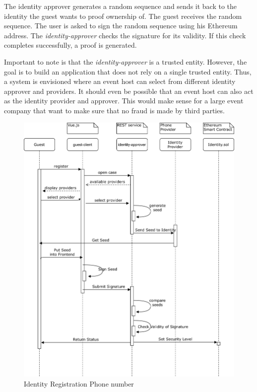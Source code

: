 The identity approver generates a random sequence and sends it back to the identity the guest wants to proof ownership of. The guest receives the random sequence. The user is asked to sign the random sequence using his Ethereum address. The \textit{identity-approver} checks the signature for its validity. If this check completes successfully, a proof is generated.

Important to note is that the \textit{identity-approver} is a trusted entity. However, the goal is to build an application that does not rely on a single trusted entity. Thus, a system is envisioned where an event host can select from different identity approver and providers. It should even be possible that an event host can also act as the identity provider and approver. This would make sense for a large event company that want to make sure that no fraud is made by third parties. 

\begin{figure}[H]
    \centering
    \includegraphics[width=16cm]{design/diagrams/identy-registration-airbnb.png}
    \caption{Identity Registration Phone number}
    \label{fig:identity-registration-airbnb}
\end{figure}

